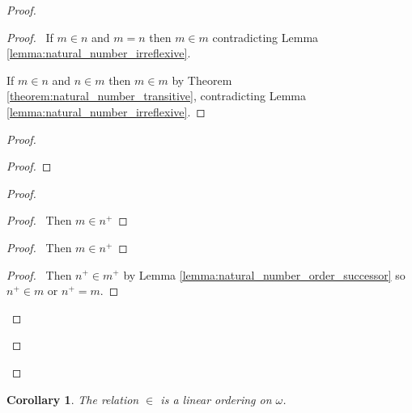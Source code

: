 \documentclass{article}
\let\qed\relax
\newtheorem{corollary}{Corollary}[axiom]
\theoremstyle{definition}
\begin{document}
    \begin{proof}
        \pf
        \begin{proof}
            \pf\ If $m \in n$ and $m = n$ then $m \in m$ contradicting Lemma \ref{lemma:natural_number_irreflexive}.

            If $m \in n$ and $n \in m$ then $m \in m$ by Theorem \ref{theorem:natural_number_transitive},
            contradicting Lemma \ref{lemma:natural_number_irreflexive}.
        \end{proof}
        \begin{proof}
            \begin{proof}
            \end{proof}
            \begin{proof}
                \begin{proof}
                    \pf\ Then $m \in n^+$
                \end{proof}
                \begin{proof}
                    \pf\ Then $m \in n^+$
                \end{proof}
                \begin{proof}
                    \pf\ Then $n^+ \in m^+$ by Lemma \ref{lemma:natural_number_order_successor}
                    so $n^+ \in m$ or $n^+ = m$.
                \end{proof}
            \end{proof}
        \end{proof}
        \qed
    \end{proof}

    \begin{corollary}
        The relation $\in$ is a linear ordering on $\omega$.    
    \end{corollary}
\end{document}
